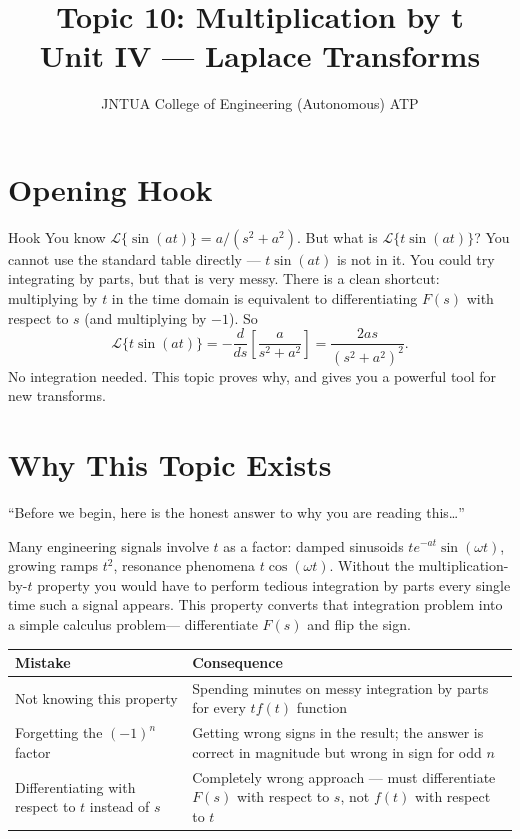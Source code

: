 \documentclass[12pt,a4paper]{article}
\title{Topic 10: Multiplication by t \\ \large Unit IV --- Laplace Transforms}
\author{JNTUA College of Engineering (Autonomous) ATP\\
        }
\date{}
\begin{document}
\maketitle
\tableofcontents
\newpage

\section{Opening Hook}
\begin{curiositybox}{Hook}
You know $\mathcal{L}\{\sin(at)\} = a/(s^2+a^2)$. But what is
$\mathcal{L}\{t\sin(at)\}$? You cannot use the standard table directly ---
$t\sin(at)$ is not in it. You could try integrating by parts, but that is very
messy. There is a clean shortcut: multiplying by $t$ in the time domain is
equivalent to differentiating $F(s)$ with respect to $s$ (and multiplying by
$-1$). So
\[
  \mathcal{L}\{t\sin(at)\} = -\frac{d}{ds}\left[\frac{a}{s^2+a^2}\right]
  = \frac{2as}{(s^2+a^2)^2}.
\]
No integration needed. This topic proves why, and gives you a powerful tool for
new transforms.
\end{curiositybox}

\section{Why This Topic Exists}
``Before we begin, here is the honest answer to why you are reading this\ldots''

Many engineering signals involve $t$ as a factor: damped sinusoids
$te^{-at}\sin(\omega t)$, growing ramps $t^2$, resonance phenomena
$t\cos(\omega t)$. Without the multiplication-by-$t$ property you would have to
perform tedious integration by parts every single time such a signal appears.
This property converts that integration problem into a simple calculus problem---
differentiate $F(s)$ and flip the sign.

\begin{center}
\begin{tabular}{@{}p{5.5cm} p{8cm}@{}}
\toprule
\textbf{Mistake} & \textbf{Consequence} \\
\midrule
Not knowing this property &
  Spending minutes on messy integration by parts for every $tf(t)$ function \\
Forgetting the $(-1)^n$ factor &
  Getting wrong signs in the result; the answer is correct in magnitude but
  wrong in sign for odd $n$ \\
Differentiating with respect to $t$ instead of $s$ &
  Completely wrong approach --- must differentiate $F(s)$ with respect to $s$,
  not $f(t)$ with respect to $t$ \\
\bottomrule
\end{tabular}
\end{center}
\end{document}
